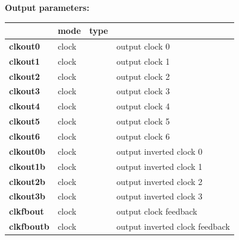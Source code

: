             {\bf Output parameters:} \\
            \begin{tabular}{| l | l | l | l |}
            \hline
                               & mode  & type   & \\
            \hline \hline
            {\bf clkout0}      & clock &         & output clock 0 \\ \hline
            {\bf clkout1}      & clock &         & output clock 1 \\ \hline
            {\bf clkout2}      & clock &         & output clock 2 \\ \hline
            {\bf clkout3}      & clock &         & output clock 3 \\ \hline
            {\bf clkout4}      & clock &         & output clock 4 \\ \hline
            {\bf clkout5}      & clock &         & output clock 5 \\ \hline
            {\bf clkout6}      & clock &         & output clock 6 \\ \hline
            {\bf clkout0b}     & clock &         & output inverted clock 0 \\ \hline
            {\bf clkout1b}     & clock &         & output inverted clock 1 \\ \hline
            {\bf clkout2b}     & clock &         & output inverted clock 2 \\ \hline
            {\bf clkout3b}     & clock &         & output inverted clock 3 \\ \hline
            {\bf clkfbout}     & clock &         & output clock feedback \\ \hline
            {\bf clkfboutb}    & clock &         & output inverted clock feedback \\ \hline
            \end{tabular}

